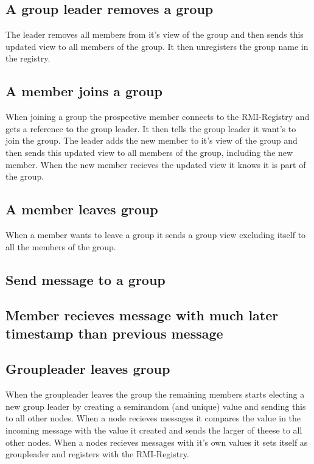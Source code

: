 \documentclass[11pt,swedish]{article}
\begin{document}
\subsection{A group leader removes a group}
The leader removes all members from it's view of the group and then sends this updated view to all members of the group. It then unregisters the group name in the registry.

\subsection{A member joins a group}
When joining a group the prospective member connects to the RMI-Registry and gets a reference to the group leader. It then tells the group leader it want's to join the group. The leader adds the new member to it's view of the group and then sends this updated view to all members of the group, including the new member. When the new member recieves the updated view it knows it is part of the group.

\subsection{A member leaves group}
When a member wants to leave a group it sends a group view excluding itself to all the members of the group.

\subsection{Send message to a group}

\subsection{Member recieves message with much later timestamp than previous message}

\subsection{Groupleader leaves group}
When the groupleader leaves the group the remaining members starts electing a new group leader by creating a semirandom (and unique) value and sending this to all other nodes. When a node recieves messages it compares the value in the incoming message with the value it created and sends the larger of theese to all other nodes. When a nodes recieves messages with it's own values it sets itself as groupleader and registers with the RMI-Registry.
\end{document}
